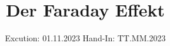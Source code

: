 

\subject{V46}
\title{Der Faraday Effekt}
\date{%
  Excution: 01.11.2023
  \hspace{3em}
  Hand-In: TT.MM.2023
}



\maketitle
\setcounter{page}{1}







\printbibliography{}


